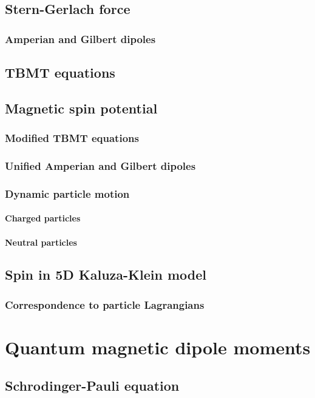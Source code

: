 \documentclass[a4paper]{report}
\begin{document}
    \section{Stern-Gerlach force}
        \subsection{Amperian and Gilbert dipoles}
    \section{TBMT equations}
    \section{Magnetic spin potential}
        \subsection{Modified TBMT equations}
        \subsection{Unified Amperian and Gilbert dipoles}
        \subsection{Dynamic particle motion}
            \subsubsection{Charged particles}
            \subsubsection{Neutral particles}
    \section{Spin in 5D Kaluza-Klein model}
        \subsection{Correspondence to particle Lagrangians}

\chapter{Quantum magnetic dipole moments}
    \section{Schrodinger-Pauli equation}
\end{document}

